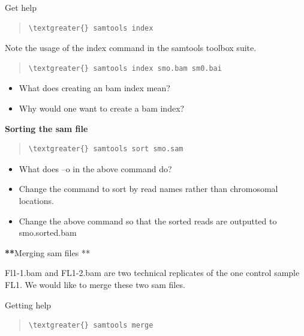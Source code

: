 \documentclass[letterpaper,10pt,english]{sphinxmanual}
\begin{document}
Get help
\begin{quote}

\begin{Verbatim}[commandchars=\\\{\}]
\textgreater{} samtools index
\end{Verbatim}
\end{quote}

Note the usage of the index command in the samtools toolbox suite.
\begin{quote}

\begin{Verbatim}[commandchars=\\\{\}]
\textgreater{} samtools index smo.bam sm0.bai
\end{Verbatim}
\end{quote}
\begin{itemize}
\item {} 
What does creating an bam index mean?

\item {} 
Why would one want to create a bam index?

\end{itemize}

\textbf{Sorting the sam file}
\begin{quote}

\begin{Verbatim}[commandchars=\\\{\}]
\textgreater{} samtools sort smo.sam
\end{Verbatim}
\end{quote}
\begin{itemize}
\item {} 
What does –o in the above command do?

\item {} 
Change the command to sort by read names rather than chromosomal locations.

\item {} 
Change the above command so that the sorted reads are outputted to smo.sorted.bam

\end{itemize}

{\color{red}\bfseries{}**}Merging sam files **

Fl1-1.bam and FL1-2.bam are two technical replicates of the one control sample FL1. We would like to merge these two sam files.

Getting help
\begin{quote}

\begin{Verbatim}[commandchars=\\\{\}]
\textgreater{} samtools merge
\end{Verbatim}
\end{quote}
\end{document}
